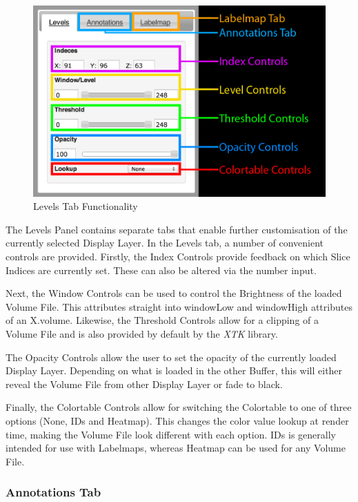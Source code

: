 \documentclass[a4paper,11pt,twoside]{article}
\begin{document}
\begin{figure}[ht!]
\centering
\includegraphics[width=140mm]{graphics/features_04.png}
\caption{Levels Tab Functionality}
\label{fig:UIdesign1}
\end{figure}

The Levels Panel contains separate tabs that enable further customisation of the currently selected Display Layer. In the Levels tab, a number of convenient controls are provided. Firstly, the Index Controls provide feedback on which Slice Indices are currently set. These can also be altered via the number input. 

Next, the Window Controls can be used to control the Brightness of the loaded Volume File. This attributes straight into windowLow and windowHigh attributes of an X.volume. Likewise, the Threshold Controls allow for a clipping of a Volume File and is also provided by default by the \textit{XTK} library.

The Opacity Controls allow the user to set the opacity of the currently loaded Display Layer. Depending on what is loaded in the other Buffer, this will either reveal the Volume File from other Display Layer or fade to black.

Finally, the Colortable Controls allow for switching the Colortable to one of three options (None, IDs and Heatmap). This changes the color value lookup at render time, making the Volume File look different with each option. IDs is generally intended for use with Labelmaps, whereas Heatmap can be used for any Volume File.



\subsubsection{Annotations Tab}
\end{document}

